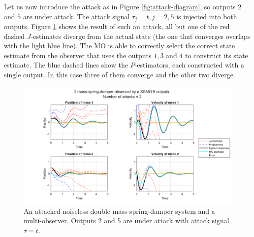 Let us now introduce the attack as in Figure \ref{fig:attack-diagram}, so outputs $2$ and $5$ are under attack. The attack signal $\tau_j=t,j=2,5$ is injected into both outputs. Figure \ref{fig:attacked-system-plot} shows the result of such an attack, all but one of the red dashed $J$-estimates diverge from the actual state (the one that converges overlaps with the light blue line). The MO is able to correctly select the correct state estimate from the observer that uses the outputs $1,3$ and $4$ to construct its state estimate. The blue dashed lines show the $P$-estimators, each constructed with a single output. In this case three of them converge and the other two diverge. 
\newpage
\begin{figure}[ht]
    \centering
    \includegraphics[width=\linewidth]{report/Figures/symplot_5o2a}
    \caption{An attacked noiseless double mass-spring-damper system and a multi-observer. Outputs 2 and 5 are under attack with attack signal $\tau=t$.} 
    \label{fig:attacked-system-plot}
\end{figure}

